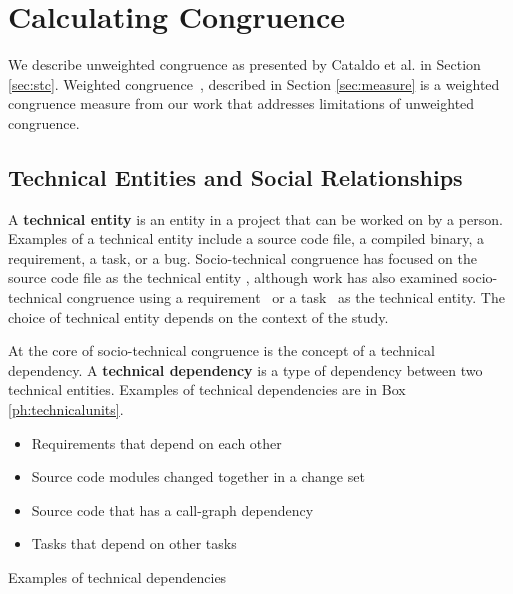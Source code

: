 \documentclass[12pt,oneside]{book}
\begin{document}



\section{Calculating Congruence}
\label{sec:congruence}

We describe unweighted congruence as presented by Cataldo et al. \cite{cataldo:cscw:2006} in Section \ref{sec:stc}. Weighted congruence~\cite{kwan2009:weighted}, described in Section \ref{sec:measure} is a weighted congruence measure from our work that addresses limitations of unweighted congruence.

\subsection{Technical Entities and Social Relationships}

A \textbf{technical entity} is an entity in a project that can be worked on by a person. Examples of a technical entity include a source code file, a compiled binary, a requirement, a task, or a bug. Socio-technical congruence has focused on the source code file as the technical entity \cite{cataldo:cscw:2006, ehrlich2008:gaps}, although work has also examined socio-technical congruence using a requirement~\cite{damian2010:rdc,marczak2009:crossfunctional} or a task~\cite{wolf2009:mining} as the technical entity. The choice of technical entity depends on the context of the study.

At the core of socio-technical congruence is the concept of a technical dependency. A \textbf{technical dependency} is a type of dependency between two technical entities. Examples of technical dependencies are in Box \ref{ph:technicalunits}.

\begin{placeholder}[t]
\begin{itemize}
\item Requirements that depend on each other~\cite{marczak:re:2008,marczak2009:crossfunctional}
\item Source code modules changed together in a change set~\cite{cataldo:cscw:2006,cataldo:esem:2008}
\item Source code that has a call-graph dependency~\cite{deSouza2004:thwarts_collaboration}
\item Tasks that depend on other tasks \cite{wolf2009:mining}
\end{itemize}

\caption{Examples of technical dependencies}
\label{ph:technicalunits}
\end{placeholder}
\end{document}
